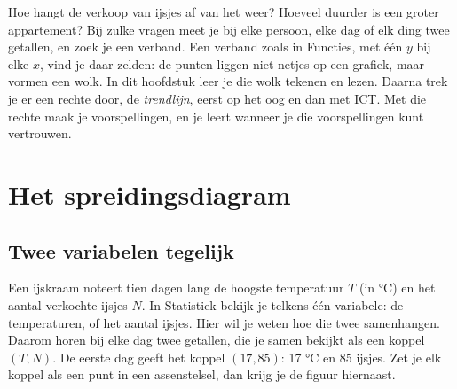 Hoe hangt de verkoop van ijsjes af van het weer? Hoeveel duurder is een groter appartement? Bij zulke vragen meet je bij elke persoon, elke dag of elk ding twee getallen, en zoek je een verband. Een verband zoals in Functies, met één $y$ bij elke $x$, vind je daar zelden: de punten liggen niet netjes op een grafiek, maar vormen een wolk. In dit hoofdstuk leer je die wolk tekenen en lezen. Daarna trek je er een rechte door, de \textit{trendlijn}, eerst op het oog en dan met ICT. Met die rechte maak je voorspellingen, en je leert wanneer je die voorspellingen kunt vertrouwen.

\begin{oefeningen}[Start]

\end{oefeningen}

\section{Het spreidingsdiagram}

\subsection{Twee variabelen tegelijk}

Een ijskraam noteert tien dagen lang de hoogste temperatuur $T$ (in °C) en het aantal verkochte ijsjes $N$. In Statistiek bekijk je telkens één variabele: de temperaturen, of het aantal ijsjes. Hier wil je weten hoe die twee samenhangen. Daarom horen bij elke dag twee getallen, die je samen bekijkt als een koppel $(T, N)$. De eerste dag geeft het koppel $(17, 85)$: 17 °C en 85 ijsjes. Zet je elk koppel als een punt in een assenstelsel, dan krijg je de figuur hiernaast.


